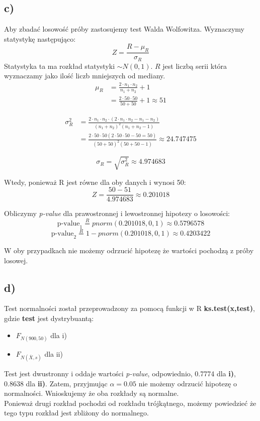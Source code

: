 \documentclass{article}
\begin{document}
\subsection{c)}
Aby zbadać losowość próby zastosujemy test Walda Wolfowitza. Wyznaczymy statystykę następująco:
\[ Z = \frac{R - \mu_R}{\sigma_R} \]
Statystyka ta ma rozkład statystyki $\sim N(0,1)$. $R$ jest liczbą serii która wyznaczamy jako ilość liczb mniejszych od mediany.
\begin{align*}
\mu_R &= \frac{2 \cdot n_1 \cdot n_2}{n_1 + n_2} + 1 \\
& = \frac{2 \cdot 50 \cdot 50}{50 + 50} + 1 \approx 51 \end{align*}

\begin{align*}
\sigma^2_R & = \frac{2 \cdot n_1 \cdot n_2 \cdot (2 \cdot n_1 \cdot n_2 - n_1 - n_2)}{(n_1+n_2)^2(n_1 + n_2 - 1)} \\
& = \frac{2 \cdot 50 \cdot 50 (2 \cdot 50 \cdot 50 - 50 = 50)}{(50 + 50)^2(50 + 50 - 1)} \approx 24.747475 \end{align*}

\[ \sigma_R = \sqrt{\sigma^2_R} \approx 4.974683 \]

Wtedy, ponieważ R jest równe dla oby danych i wynosi 50:
\[ Z = \frac{50 - 51}{4.974683} \approx 0.201018 \]

Obliczymy \textit{p-value} dla prawostronnej i lewostronnej hipotezy o losowości:
\[ \text{p-value}_1 \overset{R}{=} pnorm(0.201018, 0, 1) \approx 0.5796578 \]
\[ \text{p-value}_2 \overset{R}{=} 1 - pnorm(0.201018, 0, 1) \approx 0.4203422 \]

W oby przypadkach nie możemy odrzucić hipotezę że wartości pochodzą z próby losowej.

\subsection{d)}
Test normalności został przeprowadzony za pomocą funkcji w R \textbf{ks.test(x,test)}, gdzie \textbf{test} jest dystrybuantą:
\begin{itemize}
\item $F_{N(900,50)}$ dla i)
\item $F_{N(\overline{X},s)}$ dla ii)
\end{itemize}

Test jest dwustronny i oddaje wartości \textit{p-value}, odpowiednio, 0.7774 dla \textbf{i)}, 0.8638 dla \textbf{ii)}. Zatem, przyjmując $\alpha = 0.05$ nie możemy odrzucić hipotezę o normalności. Wnioskujemy że oba rozkłady są normalne. \\
Ponieważ drugi rozkład pochodzi od rozkładu trójkątnego, możemy powiedzieć że tego typu rozkład jest zbliżony do normalnego.
\end{document}
